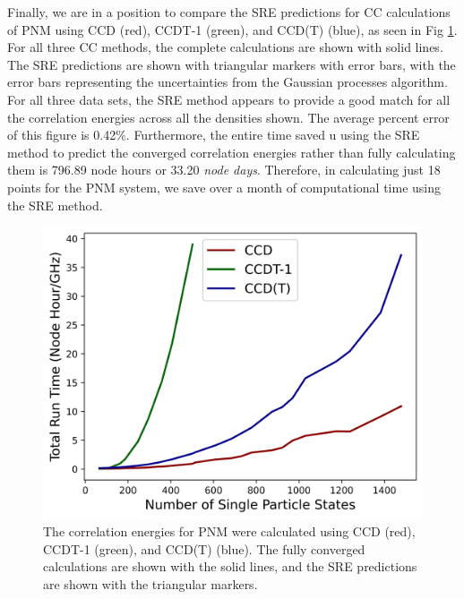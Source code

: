Finally, we are in a position to compare the SRE predictions for CC calculations of PNM using CCD (red), CCDT-1 (green), and CCD(T) (blue), as seen in Fig \ref{fig:compare_pnm_all_sre}.  For all three CC methods, the complete calculations are shown with solid lines. The SRE predictions are shown with triangular markers with error bars, with the error bars representing the uncertainties from the Gaussian processes algorithm. For all three data sets, the SRE method appears to provide a good match for all the correlation energies across all the densities shown.  The average percent error of this figure is 0.42$\%$.  Furthermore, the entire time saved u
using the SRE method to predict the converged correlation energies rather than fully calculating them is 796.89 node hours or 33.20 \textit{node days}.  Therefore, in calculating just 18 points for the PNM system, we save over a month of computational time using the SRE method. 

\begin{figure}
    \centering
    \includegraphics{Images/Chapter8/FinalReport7.png}
    \caption{The correlation energies for PNM were calculated using CCD (red), CCDT-1 (green), and CCD(T) (blue).  The fully converged calculations are shown with the solid lines, and the SRE predictions are shown with the triangular markers.}
    \label{fig:compare_pnm_all_sre}
\end{figure}

